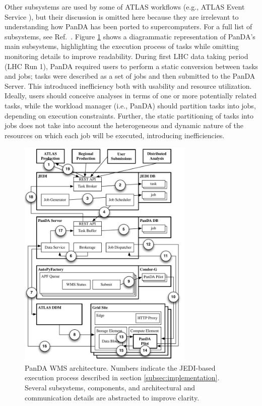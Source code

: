 Other subsystems are used by some of ATLAS workflows (e.g., ATLAS Event
Service \cite{calafiura2015atlas}), but their discussion is omitted here
because they are irrelevant to understanding how PanDA has been ported to
supercomputers. For a full list of subsystems, see Ref.~\cite{panda-wiki_url}.
Figure \ref{fig:architecture} shows a diagrammatic representation of PanDA's
main subsystems, highlighting the execution process of tasks while omitting
monitoring details to improve readability. During first LHC data taking
period (LHC Run 1), PanDA required users to perform a static conversion
between tasks and jobs; tasks were described as a set of jobs and then
submitted to the PanDA Server. This introduced inefficiency both with
usability and resource utilization. Ideally, users should conceive analyses
in terms of one or more potentially related tasks, while the workload manager
(i.e., PanDA) should partition tasks into jobs, depending on execution
constraints. Further, the static partitioning of tasks into jobs does not
take into account the heterogeneous and dynamic nature of the resources on
which each job will be executed, introducing inefficiencies.

\begin{figure}
  \includegraphics[width=0.75\textwidth]{images/Figure_1.pdf}
\caption{PanDA WMS architecture. Numbers indicate the JEDI-based execution
process described in section \ref{subsec:implementation}. Several subsystems,
components, and architectural and communication details are abstracted to
improve clarity.}
\label{fig:architecture}
\end{figure}

